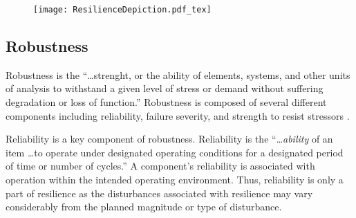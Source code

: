 \begin{figure}
  \centering
  \texttt{[image: ResilienceDepiction.pdf\_tex]}
  \label{fig:ResilienceDepiction}
\end{figure}



\subsection{Robustness}
Robustness is the ``\ldots strenght, or the ability of elements,
systems, and other units of analysis to withstand a given level of
stress or demand without suffering degradation or loss of function.''
Robustness is composed of several different components including
reliability, failure severity, and strength to resist
stressors \cite{Bruneau2003}.

Reliability is a key component of robustness. Reliability is the
``\ldots \emph{ability} of an item \ldots to operate under designated
operating conditions for a designated period of time or number of
cycles.'' A component's reliability is associated with operation
within the intended operating environment. Thus, reliability is only a
part of resilience as the disturbances associated with resilience may
vary considerably from the planned magnitude or type of
disturbance.
